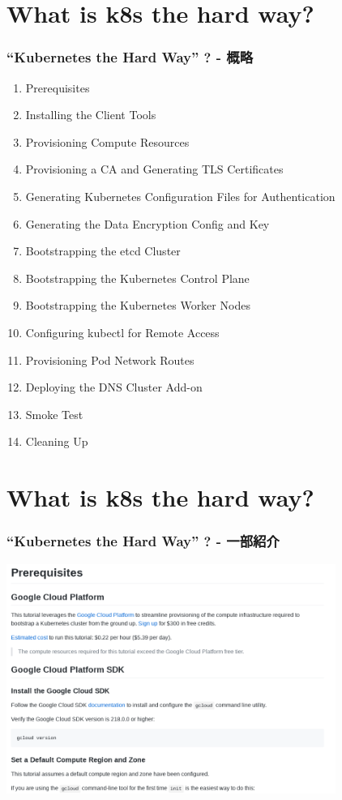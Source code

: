 \documentclass[aspectratio=169,11pt,hyperref={colorlinks=true}]{beamer}
\begin{document}
\section{What is k8s the hard way?}
\begin{frame}
  \frametitle{``Kubernetes the Hard Way'' ? - 概略}
  \begin{enumerate}
    \item Prerequisites
    \item Installing the Client Tools
    \item Provisioning Compute Resources
    \item Provisioning a CA and Generating TLS Certificates
    \item Generating Kubernetes Configuration Files for Authentication
    \item Generating the Data Encryption Config and Key
    \item Bootstrapping the etcd Cluster
    \item Bootstrapping the Kubernetes Control Plane
    \item Bootstrapping the Kubernetes Worker Nodes
    \item Configuring kubectl for Remote Access
    \item Provisioning Pod Network Routes
    \item Deploying the DNS Cluster Add-on
    \item Smoke Test
    \item Cleaning Up
  \end{enumerate}
\end{frame}

\section{What is k8s the hard way?}
\begin{frame}
  \frametitle{``Kubernetes the Hard Way'' ? - 一部紹介}
  \includegraphics[height=75mm]{images/screenshot-k8s-the-hard-way.png}
\end{frame}
\end{document}

